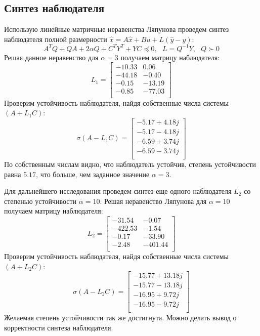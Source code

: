 \subsection{Синтез наблюдателя}
Использую линейные матричные неравенства Ляпунова проведем синтез 
наблюдателя полной размерности $\hat{x} = A\hat{x} + Bu + L(\hat{y} - y)$: 
\begin{equation}
    A^TQ + QA + 2\alpha Q + C^T Y^T + YC \preceq 0, ~~~ L = Q^{-1}Y, ~~~ Q \succ 0
\end{equation}
Решая данное неравенство для $\alpha = 3$ получаем матрицу наблюдателя: 
\begin{equation}
   L_1 = \begin{bmatrix}
    -10.33  & 0.06 \\ 
    -44.18  & -0.40 \\ 
    -0.15  & -13.19 \\ 
    -0.85  & -77.03 \\ 
    \end{bmatrix}
\end{equation}
Проверим устойчивость наблюдателя, найдя собственные числа системы $(A + L_1C)$: 
\begin{equation}
    \sigma(A - L_1C) = \begin{bmatrix}
        -5.17 + 4.18j \\ 
        -5.17 - 4.18j \\ 
        -6.59 + 3.74j \\ 
        -6.59 - 3.74j \\ 
    \end{bmatrix}
\end{equation}
По собственным числам видно, что наблюдатель устойчив, степень устойчивости равна $5.17$, что больше, чем заданное значение $\alpha = 3$. 

Для дальнейшего исследования проведем синтез еще одного наблюдателя $L_2$ со степенью устойчивости $\alpha = 10$.
Решая неравенство Ляпунова для $\alpha = 10$ получаем матрицу наблюдателя:
\begin{equation}
    L_2 = \begin{bmatrix}
    -31.54  & -0.07 \\ 
    -422.53  & -1.54 \\ 
    -0.17  & -33.90 \\ 
    -2.48  & -401.44 \\
    \end{bmatrix}
\end{equation}
Проверим устойчивость наблюдателя, найдя собственные числа системы $(A + L_2C)$:
\begin{equation}
    \sigma(A - L_2C) = \begin{bmatrix}
    -15.77 + 13.18j \\ 
    -15.77 - 13.18j \\ 
    -16.95 + 9.72j \\ 
    -16.95 - 9.72j \\
    \end{bmatrix}
\end{equation}
Желаемая степень устойчивости так же достигнута. Можно делать вывод о корректности синтеза наблюдателя. 

